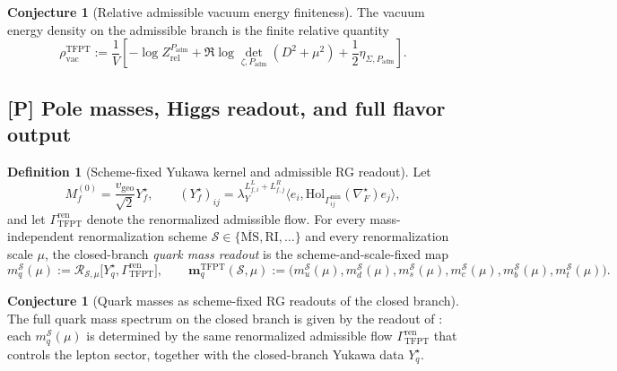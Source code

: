 \documentclass[11pt,a4paper]{article}
\theoremstyle{definition}
\newtheorem{definition}[theorem]{Definition}
\newtheorem{conjecture}[theorem]{Conjecture}
\theoremstyle{remark}
\newcommand{\vgeo}{v_{\mathrm{geo}}}
\newcommand{\Padm}{P_{\mathrm{adm}}}
\begin{document}
\begin{conjecture}[Relative admissible vacuum energy finiteness]
\label{thm:relative_admissible_vacuum_energy_finiteness}
The vacuum energy density on the admissible branch is the finite relative quantity
\[
\rho_{\mathrm{vac}}^{\mathrm{TFPT}}
:=
\frac1V\left[-\log Z_{\mathrm{rel}}^{\Padm}+\Re\log\det_{\zeta,\Padm}(D^2+\mu^2)+\frac12\eta_{\Sigma,\Padm}\right].
\]
\end{conjecture}

\subsection{[P] Pole masses, Higgs readout, and full flavor output}

\begin{definition}[Scheme-fixed Yukawa kernel and admissible RG readout]
\label{def:scheme-fixed-yukawa-kernel}
Let
\[
M_f^{(0)}=\frac{\vgeo}{\sqrt2}Y_f^\star,
\qquad
(Y_f^\star)_{ij}
=
\lambda_Y^{L_{f,i}^L+L_{f,j}^R}
\langle e_i,\mathrm{Hol}_{\Gamma_{ij}^{\min}}(\nabla_F^\star)e_j\rangle,
\]
and let $\Gamma_{\mathrm{TFPT}}^{\mathrm{ren}}$ denote the renormalized admissible flow. For every
mass-independent renormalization scheme $\mathcal S\in\{\overline{\mathrm{MS}},\mathrm{RI},\dots\}$
and every renormalization scale $\mu$, the closed-branch \emph{quark mass readout} is the
scheme-and-scale-fixed map
\[
m_q^{\mathcal S}(\mu)
:=
\mathcal R_{\mathcal S,\mu}\bigl[Y_q^\star,\Gamma_{\mathrm{TFPT}}^{\mathrm{ren}}\bigr],
\qquad
\mathbf m_q^{\mathrm{TFPT}}(\mathcal S,\mu)
:=
\bigl(m_u^{\mathcal S}(\mu),m_d^{\mathcal S}(\mu),m_s^{\mathcal S}(\mu),
m_c^{\mathcal S}(\mu),m_b^{\mathcal S}(\mu),m_t^{\mathcal S}(\mu)\bigr).
\]
\end{definition}

\begin{conjecture}[Quark masses as scheme-fixed RG readouts of the closed branch]
\label{thm:closed_pole_mass_completion}
The full quark mass spectrum on the closed branch is given by the readout of
: each $m_q^{\mathcal S}(\mu)$ is determined by the same
renormalized admissible flow $\Gamma_{\mathrm{TFPT}}^{\mathrm{ren}}$ that controls the lepton sector,
together with the closed-branch Yukawa data $Y_q^\star$.
\end{conjecture}
\end{document}
